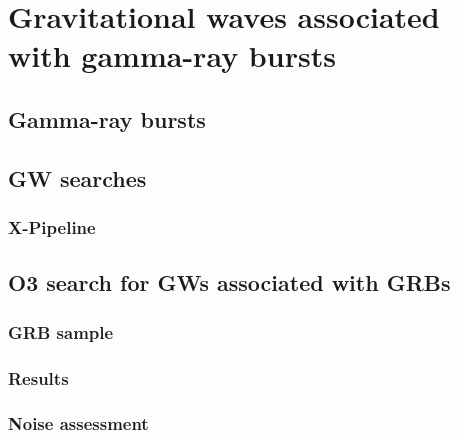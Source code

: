 \chapter{Gravitational waves associated with gamma-ray bursts}

\section{Gamma-ray bursts}

\section{GW searches}

\subsection{X-Pipeline}

\section{O3 search for GWs associated with GRBs}

\subsection{GRB sample}

\subsection{Results}

\subsection{Noise assessment}

